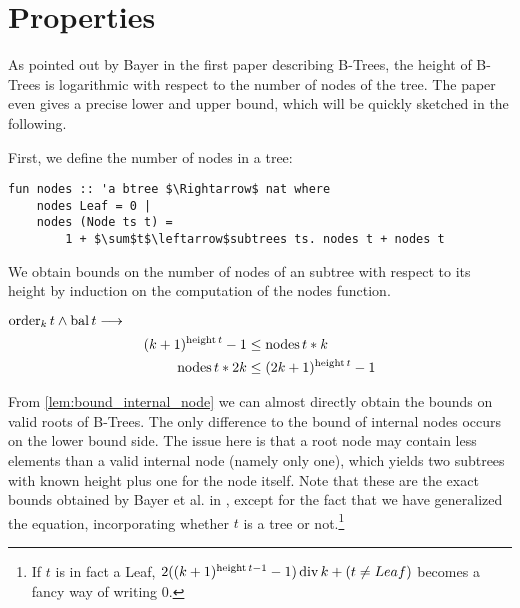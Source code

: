 \section{Properties}

As pointed out by Bayer in the first paper describing B-Trees,
the height of B-Trees is logarithmic with respect to the number
of nodes of the tree. \parencite{DBLP:journals/acta/BayerM72}
The paper even gives a precise lower and upper bound, which will be quickly sketched in the following.

First, we define the number of nodes in a tree:
\begin{lstlisting}[mathescape=true, language=Isabelle]
fun nodes :: 'a btree $\Rightarrow$ nat where
    nodes Leaf = 0 |
    nodes (Node ts t) =
        1 + $\sum$t$\leftarrow$subtrees ts. nodes t + nodes t
\end{lstlisting}


We obtain bounds
on the number of nodes of an subtree with respect to its height
by induction on the computation of the nodes function.

\begin{lemma}
    \label{lem:bound_internal_node}
    $\operatorname{order}_k t \wedge \operatorname{bal} t \longrightarrow$
    \begin{align}
        (k+1)^{\operatorname{height} t} - 1 &\le \operatorname{nodes} t * k \\
        \operatorname{nodes} t * 2k &\le (2k+1)^{\operatorname{height} t} - 1
    \end{align}
\end{lemma}

From \autoref{lem:bound_internal_node} we can almost directly obtain
the bounds on valid roots of B-Trees.
The only difference to the bound of internal nodes occurs on the lower bound side.
The issue here is that a root node may contain less elements than
a valid internal node (namely only one), which yields two subtrees with known height
plus one for the node itself.
Note that these are the exact bounds obtained by Bayer et al. in \parencite{DBLP:journals/acta/BayerM72},
except for the fact that we have generalized the equation,
incorporating whether $t$ is a tree or not.\footnote{
    If $t$ is in fact a Leaf,
    $2((k+1)^{\operatorname{height} t - 1} - 1) \operatorname{div} k + (t \neq Leaf)$ becomes a fancy way of writing $0$.
}

